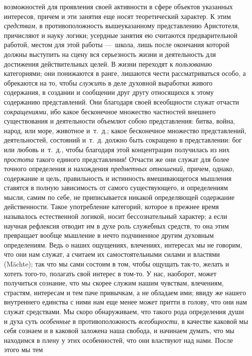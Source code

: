 возможностей для проявления своей активности в сфере объектов указанных
интересов, причем и эти занятия еще носят теоретический характер. К этим
{\em средствам}, в противоположность вышеуказанному
представлению Аристотеля, причисляют и науку логики; усердные занятия ею
считаются предварительной работой, местом для этой работы —~школа, лишь
после окончания которой должны выступить на сцену вся серьезность жизни и
деятельность для достижения действительных целей. В жизни переходят к
{\em пользованию} категориями; они понижаются в ранге,
лишаются чести рассматриваться особо, а обрекаются на то, чтобы
{\em служить} в деле духовной выработки живого
содержания, в создании и сообщении друг другу относящихся к этому
содержанию представлений. Они благодаря своей всеобщности служат отчасти
{\em сокращениями}, ибо какое бесконечное множество
частностей внешнего существования и деятельности объемлют собою
представления: битва, война, народ, или море, животное и~т.~д.; какое
бесконечное множество представлений, деятельностей, состояний и~т.~д.
должно быть сокращено в представлении: бог или любовь и~т.~д., чтобы
благодаря этой концентрации получилась из них
{\em простота} такого единого представления! Отчасти же
они служат для более точного определения и нахождения
{\em предметных отношений}, причем, однако, содержание
и цель, правильность и истинность вмешивающегося мышления ставятся в полную
зависимость от самого существующего, и определениям мысли, самим по себе,
не приписывается никакой определяющей содержание действенности. Такое
употребление категорий, которое в прежнее время называлось естественной
логикой, носит бессознательный характер; а если научная рефлексия отводит
им в духе роль служебных средств, то она этим превращает вообще мышление в
нечто подчиненное другим духовным определениям. Ведь о наших ощущениях,
влечениях, интересах мы не говорим, что они нам служат, а считаем их
самостоятельными силами и властями (Mächte); так что мы сами состоим в том,
чтобы ощущать так-то, желать и хотеть того-то, полагать свой интерес в
том-то. У нас, наоборот, может получиться сознание, что мы скорее служим
нашим чувствам, влечениям, страстям, интересам и тем паче привычкам, а не
обладаем ими; ввиду же нашего внутреннего единства с ними нам еще менее
может притти в голову, что они нам служат средствами. Мы скоро
обнаруживаем, что такого рода определения души и духа суть
{\em особенные} в противоположность
{\em всеобщности}, в качестве каковой мы себя сознаем и
в каковой заложена наша свобода, и начинаем думать, что мы находимся в
плену у этих особенностей, что они властвуют над нами. После этого мы тем
